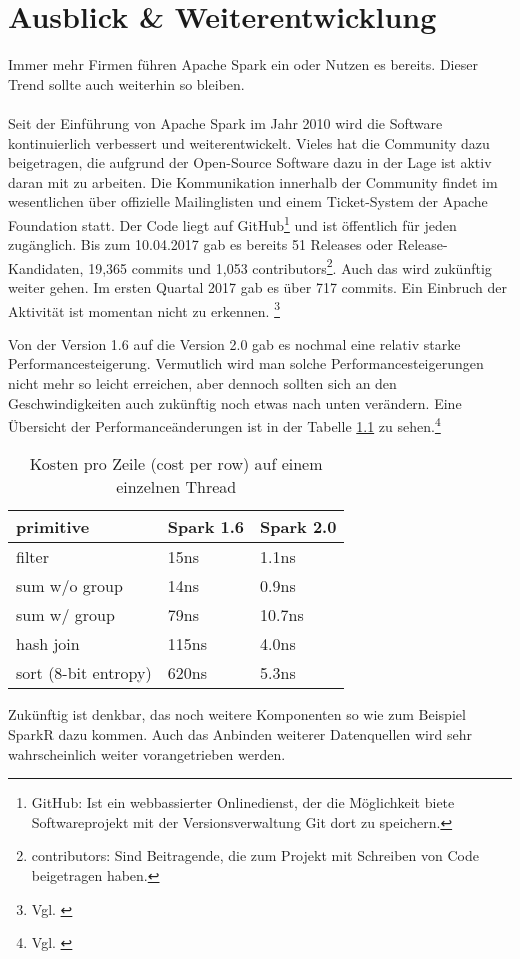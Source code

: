 \newpage
\chapter{Ausblick \& Weiterentwicklung} 

Immer mehr Firmen führen Apache Spark ein oder Nutzen es bereits. Dieser Trend sollte auch weiterhin so bleiben.
\\ \\
\noindent
Seit der Einführung von Apache Spark im Jahr 2010 wird die Software kontinuierlich verbessert und weiterentwickelt. 
Vieles hat die Community dazu beigetragen, die aufgrund der Open-Source Software dazu in der Lage ist aktiv daran mit zu arbeiten. 
Die Kommunikation innerhalb der Community findet im wesentlichen über offizielle Mailinglisten und einem Ticket-System der Apache Foundation statt.
Der Code liegt auf GitHub\footnote{GitHub: Ist ein webbassierter Onlinedienst, der die Möglichkeit biete Softwareprojekt mit der Versionsverwaltung Git dort zu speichern.} und ist öffentlich für jeden zugänglich. 
Bis zum 10.04.2017 gab es bereits 51 Releases oder Release-Kandidaten, 19,365 commits und 1,053 contributors\footnote{contributors: Sind Beitragende, die zum Projekt mit Schreiben von Code beigetragen haben. }.
Auch das wird zukünftig weiter gehen. Im ersten Quartal 2017 gab es über 717 commits. Ein Einbruch der Aktivität ist momentan nicht zu erkennen. \footnote{Vgl. \cite{GITHUB}}


\noindent
Von der Version 1.6 auf die Version 2.0 gab es nochmal eine relativ starke Performancesteigerung. Vermutlich wird man solche Performancesteigerungen nicht mehr so leicht erreichen, aber dennoch sollten sich an den Geschwindigkeiten auch zukünftig noch etwas nach unten verändern. Eine Übersicht der Performanceänderungen ist in der Tabelle \ref{tab:spark_2_0} zu sehen.\footnote{Vgl. \cite{DATABRICK_SPARK_2_0}}


\begin{table}[h]
  \centering
		
		  \begin{tabular}[t]{|l|l|l|}
    \hline
		
		\rowcolor[gray]{.9}
		
				primitive	 & Spark 1.6 &  Spark 2.0 \\ \hline				
				filter &	15ns &	1.1ns \\ \hline				
				sum w/o group &	14ns &	0.9ns \\ \hline				
				sum w/ group &	79ns &	10.7ns \\ \hline				
				hash join	& 115ns	& 4.0ns \\ \hline				
				sort (8-bit entropy)	& 620ns	 & 5.3ns \\ \hline				

  \end{tabular}
		
  \caption{Kosten pro Zeile (cost per row) auf einem einzelnen Thread}\label{tab:spark_2_0}
\end{table}



\noindent
Zukünftig ist denkbar, das noch weitere Komponenten so wie zum Beispiel SparkR dazu kommen. Auch das Anbinden weiterer Datenquellen wird sehr wahrscheinlich weiter vorangetrieben werden.